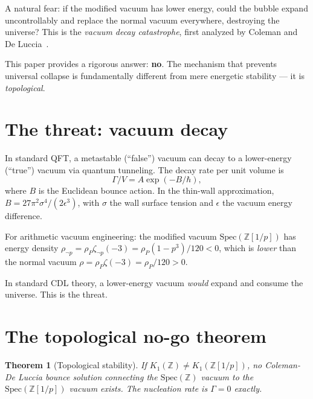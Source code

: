 \documentclass[11pt,a4paper]{article}
\newtheorem{theorem}{Theorem}
\newcommand{\Spec}{\mathrm{Spec}}
\newcommand{\Zp}{\mathbb{Z}[1/p]}
\begin{document}
A natural fear: if the modified vacuum has lower energy, could
the bubble expand uncontrollably and replace the normal vacuum
everywhere, destroying the universe? This is the
\emph{vacuum decay catastrophe}, first analyzed by
Coleman and De Luccia~\cite{ColemanDeLuccia1980}.

This paper provides a rigorous answer: \textbf{no}. The
mechanism that prevents universal collapse is fundamentally
different from mere energetic stability --- it is
\emph{topological}.

\section{The threat: vacuum decay}

In standard QFT, a metastable (``false'') vacuum can decay to
a lower-energy (``true'') vacuum via quantum tunneling.
The decay rate per unit volume is~\cite{ColemanDeLuccia1980}
\begin{equation}
  \Gamma/V = A \exp(-B/\hbar),
  \label{eq:cdl}
\end{equation}
where $B$ is the Euclidean bounce action. In the thin-wall
approximation, $B = 27\pi^2 \sigma^4 / (2\epsilon^3)$,
with $\sigma$ the wall surface tension and $\epsilon$ the
vacuum energy difference.

For arithmetic vacuum engineering: the modified vacuum
$\Spec(\Zp)$ has energy density
$\rho_{\neg p} = \rho_P \zeta_{\neg p}(-3)
= \rho_P (1-p^3)/120 < 0$, which is \emph{lower} than the
normal vacuum $\rho = \rho_P \zeta(-3) = \rho_P/120 > 0$.

In standard CDL theory, a lower-energy vacuum \emph{would}
expand and consume the universe. This is the threat.

\section{The topological no-go theorem}

\begin{theorem}[Topological stability]
\label{thm:nogo}
If $K_1(\mathbb{Z}) \neq K_1(\Zp)$, no Coleman-De Luccia
bounce solution connecting the $\Spec(\mathbb{Z})$ vacuum to
the $\Spec(\Zp)$ vacuum exists. The nucleation rate is
$\Gamma = 0$ exactly.
\end{theorem}
\end{document}
